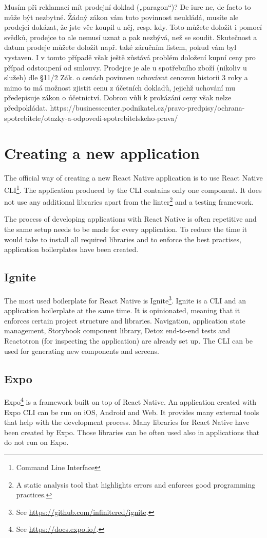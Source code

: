 \documentclass[
  digital, %
  table,   %
  oneside, %
  lof,     %
  lot,     %
]{fithesis3}
\begin{document}
Musím při reklamaci mít prodejní doklad („paragon“)?
De iure ne, de facto to může být nezbytné. Žádný zákon vám tuto povinnost neukládá, musíte ale prodejci dokázat, že jste věc koupil u něj, resp. kdy. Toto můžete doložit i pomocí svědků, prodejce to ale nemusí uznat a pak nezbývá, než se soudit. Skutečnost a datum prodeje můžete doložit např. také záručním listem, pokud vám byl vystaven. I v tomto případě však ještě zůstává problém doložení kupní ceny pro případ odstoupení od smlouvy. Prodejce je ale u spotřebního zboží (nikoliv u služeb) dle §11/2 Zák. o cenách povinnen uchovávat cenovou historii 3 roky a mimo to má možnost zjistit cenu z účetních dokladů, jejichž uchování mu předepisuje zákon o účetnictví. Dobrou vůli k prokázání ceny však nelze předpokládat.
https://businesscenter.podnikatel.cz/pravo-predpisy/ochrana-spotrebitele/otazky-a-odpovedi-spotrebitelskeho-prava/

\chapter{Creating a new application}
The official way of creating a new React Native application is to use React Native CLI\footnote{Command Line Interface}. The application produced by the CLI contains only one component. It does not use any additional libraries apart from the linter\footnote{A static analysis tool that highlights errors and enforces good programming practices.} and a testing framework.

The process of developing applications with React Native is often repetitive and the same setup needs to be made for every application. To reduce the time it would take to install all required libraries and to enforce the best practises, application boilerplates have been created.

\section{Ignite}
The most used boilerplate for React Native is Ignite\footnote{See \url{https://github.com/infinitered/ignite}.}.
Ignite is a CLI and an application boilerplate at the same time. It is opinionated, meaning that it enforces certain project structure and libraries. Navigation, application state management, Storybook component library, Detox end-to-end tests and Reactotron (for inspecting the application) are already set up. The CLI can be used for generating new components and screens.

\section{Expo}
Expo\footnote{See \url{https://docs.expo.io/}.} is a framework built on top of React Native. An application created with Expo CLI can be run on iOS, Android and Web. It provides many external tools that help with the development process. 
Many libraries for React Native have been created by Expo. Those libraries can be often used also in applications that do not run on Expo.
\end{document}
